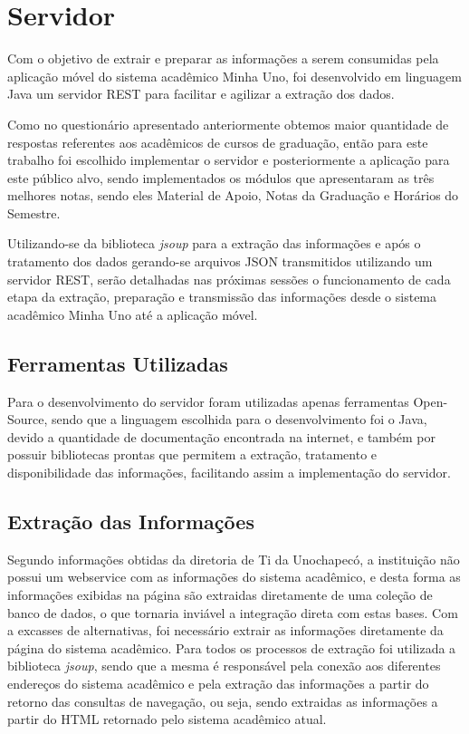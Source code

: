 \chapter{Servidor}

Com o objetivo de extrair e preparar as informações a serem consumidas pela aplicação móvel do sistema acadêmico Minha Uno, foi desenvolvido em linguagem Java um servidor REST para facilitar e agilizar a extração dos dados. 

Como no questionário apresentado anteriormente obtemos maior quantidade de respostas referentes aos acadêmicos de cursos de graduação, então para este trabalho foi escolhido implementar o servidor e posteriormente a aplicação para este público alvo, sendo implementados os módulos que apresentaram as três melhores notas, sendo eles Material de Apoio, Notas da Graduação e Horários do Semestre.

Utilizando-se da biblioteca \emph{jsoup} para a extração das informações e após o tratamento dos dados gerando-se arquivos JSON transmitidos utilizando um servidor REST, serão detalhadas nas próximas sessões o funcionamento de cada etapa da extração, preparação e transmissão das informações desde o sistema acadêmico Minha Uno até a aplicação móvel.

\section{Ferramentas Utilizadas}
Para o desenvolvimento do servidor foram utilizadas apenas ferramentas Open-Source, sendo que a linguagem escolhida para o desenvolvimento foi o Java, devido a quantidade de documentação encontrada na internet, e também por possuir bibliotecas prontas que permitem a extração, tratamento e disponibilidade das informações, facilitando assim a implementação do servidor.

\section{Extração das Informações}

Segundo informações obtidas da diretoria de Ti da Unochapecó, a instituição não possui um webservice com as informações do sistema acadêmico, e desta forma as informações exibidas na página são extraidas diretamente de uma coleção de banco de dados, o que tornaria inviável a integração direta com estas bases. Com a excasses de alternativas, foi necessário extrair as informações diretamente da página do sistema acadêmico. Para todos os processos de extração foi utilizada a biblioteca \emph{jsoup}, sendo que a mesma é responsável pela conexão aos diferentes endereços do sistema acadêmico e pela extração das informações a partir do retorno das consultas de navegação, ou seja, sendo extraidas as informações a partir do HTML retornado pelo sistema acadêmico atual.

